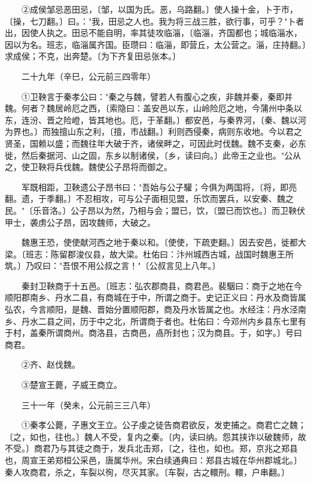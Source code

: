 　　②成侯邹忌恶田忌，〔邹，以国为氏。恶，乌路翻。〕使人操十金，卜于市，〔操，七刀翻。〕曰。："我，田忌之人也。我为将三战三胜，欲行事，可乎？"卜者出，因使人执之。田忌不能自明，率其徒攻临淄，〔临淄，齐国都也；城临淄水，因以为名。班志，临淄属齐国。臣瓒曰：临淄，即营丘，太公营之。淄，庄持翻。〕求成侯；不克，出奔楚。〔为下齐复田忌张本。〕

　　二十九年（辛巳，公元前三四零年）

　　①卫鞅言于秦孝公曰："秦之与魏，譬若人有腹心之疾，非魏并秦，秦即并魏。何者？魏居岭厄之西，〔索隐曰：盖安邑以东，山岭险厄之地，今蒲州中条以东，连汾、晋之险嶝，皆其地也。厄，于革翻。〕都安邑，与秦界河，〔秦、魏以河为界也。〕而独擅山东之利，〔擅，市战翻。〕利则西侵秦，病则东收地。今以君之贤圣，国赖以盛；而魏往年大破于齐，诸侯畔之，可因此时伐魏。魏不支秦，必东徙，然后秦据河、山之固，东乡以制诸侯，〔乡，读曰向。〕此帝王之业也。"公从之，使卫鞅将兵伐魏。魏使公子昂将而御之。

　　军既相距，卫鞅遗公子昂书曰："吾始与公子驩；今俱为两国将，〔将，即亮翻。遗，于季翻。〕不忍相攻，可与公子面相见盟，乐饮而罢兵，以安秦、魏之民。"〔乐音洛。〕公子昂以为然，乃相与会；盟已，饮，〔盟已而饮也。〕而卫鞅伏甲士，袭虏公子昂，因攻魏师，大破之。

　　魏惠王恐，使使献河西之地于秦以和。〔使使，下疏吏翻。〕因去安邑，徙都大梁。〔班志：陈留郡浚仪县，故大梁。杜佑曰：汴州城西古城，战国时魏惠王所筑。〕乃叹曰："吾恨不用公叔之言！"〔公叔言见上八年。〕

　　秦封卫鞅商于十五邑。〔班志：弘农郡商县，商君邑。裴駰曰：商于之地在今顺阳郡南乡、丹水二县，有商城在于中，所谓之商于。史记正义曰：丹水及商皆属弘农，今言顺阳，是魏、晋始分置顺阳郡，商及丹水皆属之也。水经注：丹水泾南乡、丹水二县之间，历于中之北，所谓商于者也。杜佑曰：今邓州内乡县东七里有于村，盖秦所谓商州。商洛县，古商邑，卨所封也；汉为商县。于，如字。〕号曰商君。

　　②齐、赵伐魏。

　　③楚宣王薨，子威王商立。

　　三十一年（癸未，公元前三三八年）

　　①秦孝公薨，子惠文王立。公子虔之徒告商君欲反，发吏捕之。商君亡之魏；〔之，如也，往也。〕魏人不受，复内之秦。〔内，读曰纳。怨其挟诈以破魏师，故不受。〕商君乃与其徒之商于，发兵北击郑，〔之，往也，如也。郑，京兆之郑县也，周宣王弟郑桓公采邑，唐属华州。宋白续通典曰：郑县古城在华州郡城北。〕秦人攻商君，杀之，车裂以徇，尽灭其家。〔车裂，古之轘刑。轘，户串翻。〕

